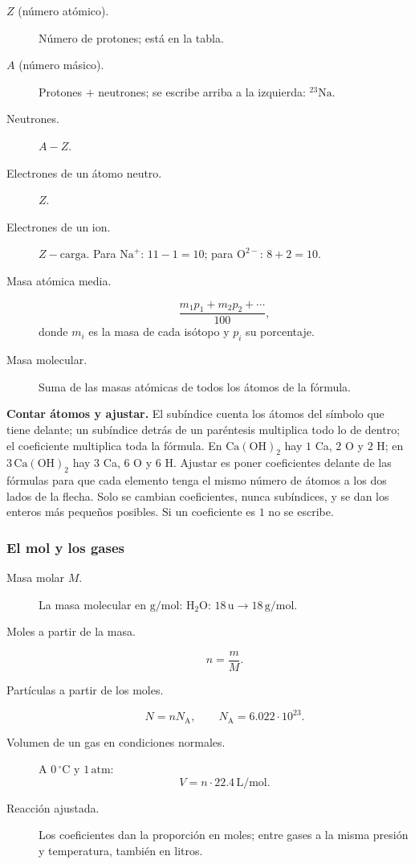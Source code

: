 \begin{description}
    \item[$Z$ (número atómico).]
    Número de protones; está en la tabla.

    \item[$A$ (número másico).]
    Protones $+$ neutrones; se escribe arriba a la izquierda:
    ${}^{23}\mathrm{Na}$.

    \item[Neutrones.]
    $A-Z$.

    \item[Electrones de un átomo neutro.]
    $Z$.

    \item[Electrones de un ion.]
    $Z-\mbox{carga}$.
    Para $\mathrm{Na}^{+}$: $11-1=10$;
    para $\mathrm{O}^{2-}$: $8+2=10$.

    \item[Masa atómica media.]
    \[
    \frac{m_1p_1+m_2p_2+\cdots}{100},
    \]
    donde $m_i$ es la masa de cada isótopo y $p_i$ su porcentaje.

    \item[Masa molecular.]
    Suma de las masas atómicas de todos los átomos de la fórmula.
\end{description}

\textbf{Contar átomos y ajustar.}
El subíndice cuenta los átomos del símbolo que tiene delante;
un subíndice detrás de un paréntesis multiplica todo lo de dentro;
el coeficiente multiplica toda la fórmula.
En $\mathrm{Ca(OH)_2}$ hay $1$ Ca, $2$ O y $2$ H;
en $3\,\mathrm{Ca(OH)_2}$ hay $3$ Ca, $6$ O y $6$ H.
Ajustar es poner coeficientes delante de las fórmulas para que cada
elemento tenga el mismo número de átomos a los dos lados de la flecha.
Solo se cambian coeficientes, nunca subíndices, y se dan los enteros
más pequeños posibles. Si un coeficiente es $1$ no se escribe.

\subsubsection*{El mol y los gases}

\begin{description}
    \item[Masa molar $M$.]
    La masa molecular en $\mathrm{g/mol}$:
    $\mathrm{H_2O}$: $18\,\mathrm{u}\rightarrow18\,\mathrm{g/mol}$.

    \item[Moles a partir de la masa.]
    \[
    n=\frac{m}{M}.
    \]

    \item[Partículas a partir de los moles.]
    \[
    N=nN_{\mathrm{A}},
    \qquad N_{\mathrm{A}}=6.022\cdot10^{23}.
    \]

    \item[Volumen de un gas en condiciones normales.]
    A $0\,{}^\circ\mathrm{C}$ y $1\,\mathrm{atm}$:
    \[
    V=n\cdot22.4\,\mathrm{L/mol}.
    \]

    \item[Reacción ajustada.]
    Los coeficientes dan la proporción en moles;
    entre gases a la misma presión y temperatura, también en litros.
\end{description}

